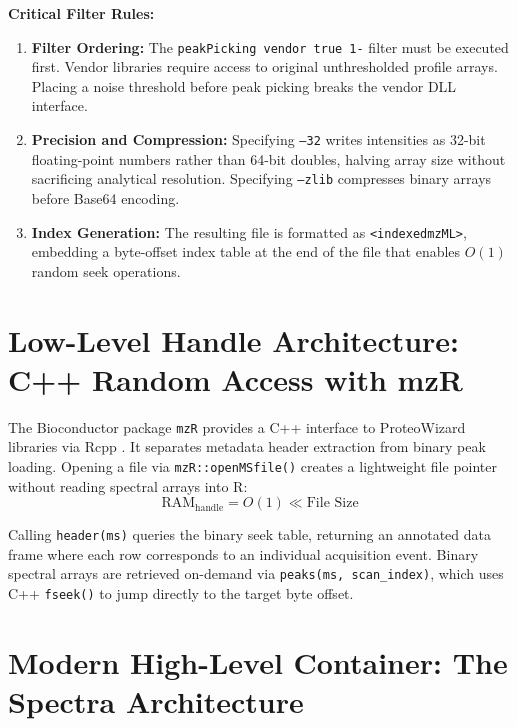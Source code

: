 \documentclass[11pt,twoside,openright]{book}
\begin{document}
\noindent\textbf{Critical Filter Rules:}
\begin{enumerate}
    \item \textbf{Filter Ordering:} The \texttt{peakPicking vendor true 1-} filter must be executed first. Vendor libraries require access to original unthresholded profile arrays. Placing a noise threshold before peak picking breaks the vendor DLL interface.
    \item \textbf{Precision and Compression:} Specifying \texttt{--32} writes intensities as 32-bit floating-point numbers rather than 64-bit doubles, halving array size without sacrificing analytical resolution. Specifying \texttt{--zlib} compresses binary arrays before Base64 encoding.
    \item \textbf{Index Generation:} The resulting file is formatted as \texttt{<indexedmzML>}, embedding a byte-offset index table at the end of the file that enables $O(1)$ random seek operations.
\end{enumerate}

\section{Low-Level Handle Architecture: C++ Random Access with mzR}
\label{sec:mzr_handles}

The Bioconductor package \texttt{mzR} provides a C++ interface to ProteoWizard libraries via Rcpp \cite{eddelbuettel2011rcpp, chambers2012proteowizard}. It separates metadata header extraction from binary peak loading. Opening a file via \texttt{mzR::openMSfile()} creates a lightweight file pointer without reading spectral arrays into R:
\begin{equation}
\text{RAM}_{\text{handle}} = O(1) \ll \text{File Size}
\end{equation}

Calling \texttt{header(ms)} queries the binary seek table, returning an annotated data frame where each row corresponds to an individual acquisition event. Binary spectral arrays are retrieved on-demand via \texttt{peaks(ms, scan\_index)}, which uses C++ \texttt{fseek()} to jump directly to the target byte offset.

\section{Modern High-Level Container: The Spectra Architecture}
\label{sec:spectra_architecture}
\end{document}

